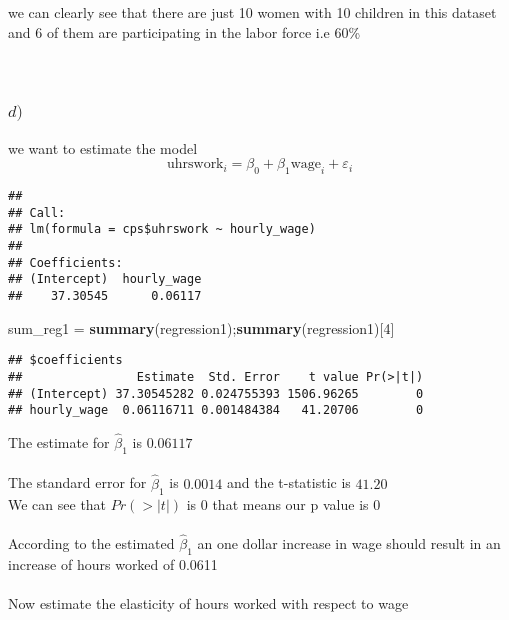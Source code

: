 \documentclass[
]{article}
\newenvironment{Shaded}{\begin{snugshade}}{\end{snugshade}}
\newcommand{\DecValTok}[1]{\textcolor[rgb]{0.00,0.00,0.81}{#1}}
\newcommand{\KeywordTok}[1]{\textcolor[rgb]{0.13,0.29,0.53}{\textbf{#1}}}
\newcommand{\NormalTok}[1]{#1}
\newcommand{\OperatorTok}[1]{\textcolor[rgb]{0.81,0.36,0.00}{\textbf{#1}}}
\newcommand{\StringTok}[1]{\textcolor[rgb]{0.31,0.60,0.02}{#1}}
\begin{document}
we can clearly see that there are just 10 women with 10 children in this
dataset and 6 of them are participating in the labor force i.e
\(60\)\%\\
~\\
~\\

\hypertarget{d}{%
\subsubsection{\texorpdfstring{\(d)\)}{d)}}\label{d}}

\hfill\break

we want to estimate the model
\[\textrm{uhrswork}_i = \beta_0 + \beta_1 \textrm{wage}_i + \varepsilon_i\]

\begin{Shaded}
\end{Shaded}

\begin{verbatim}
## 
## Call:
## lm(formula = cps$uhrswork ~ hourly_wage)
## 
## Coefficients:
## (Intercept)  hourly_wage  
##    37.30545      0.06117
\end{verbatim}

\begin{Shaded}
\begin{Highlighting}[]
\NormalTok{sum\_reg1 =}\StringTok{ }\KeywordTok{summary}\NormalTok{(regression1);}\KeywordTok{summary}\NormalTok{(regression1)[}\DecValTok{4}\NormalTok{]}
\end{Highlighting}
\end{Shaded}

\begin{verbatim}
## $coefficients
##                Estimate  Std. Error    t value Pr(>|t|)
## (Intercept) 37.30545282 0.024755393 1506.96265        0
## hourly_wage  0.06116711 0.001484384   41.20706        0
\end{verbatim}

The estimate for \(\hat{\beta}_1\) is \(0.06117\)\\
~\\
The standard error for \(\hat{\beta}_1\) is \(0.0014\) and the
t-statistic is \(41.20\)\\
We can see that \(Pr(>|t|)\) is \(0\) that means our p value is 0\\
~\\
According to the estimated \(\hat{\beta}_1\) an one dollar increase in
wage should result in an increase of hours worked of 0.0611\\
~\\
Now estimate the elasticity of hours worked with respect to wage
\end{document}
